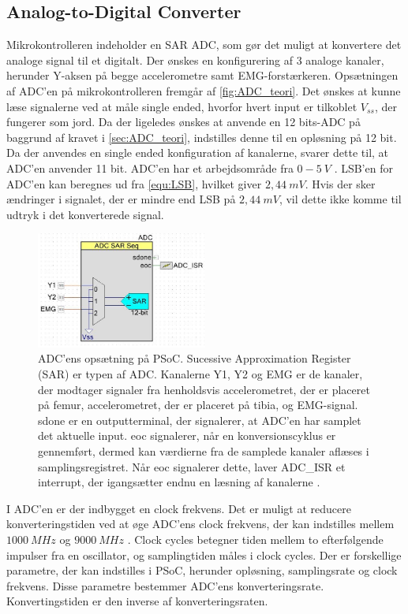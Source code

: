 \subsection{Analog-to-Digital Converter}
Mikrokontrolleren indeholder en SAR ADC, som gør det muligt at konvertere det analoge signal til et digitalt. Der ønskes en konfigurering af 3 analoge kanaler, herunder Y-aksen på begge accelerometre samt EMG-forstærkeren. Opsætningen af ADC'en på mikrokontrolleren fremgår af \autoref{fig:ADC_teori}. Det ønskes at kunne læse signalerne ved at måle single ended, hvorfor hvert input er tilkoblet $V_{ss}$, der fungerer som jord. Da der ligeledes ønskes at anvende en 12 bits-ADC på baggrund af kravet i \autoref{sec:ADC_teori}, indstilles denne til en opløsning på 12 bit. Da der anvendes en single ended konfiguration af kanalerne, svarer dette til, at ADC'en anvender 11 bit. ADC'en har et arbejdsområde fra $0-5~V$ \citep{ADC2014}. LSB'en for ADC'en kan beregnes ud fra \autoref{equ:LSB}, hvilket giver $2,44~mV$. Hvis der sker ændringer i signalet, der er mindre end LSB på $2,44~mV$, vil dette ikke komme til udtryk i det konverterede signal. 


\begin{figure}[H]
\centering
\includegraphics[width=0.5\textwidth]{figures/implementering/ADC_imp.jpg}
\caption{ADC'ens opsætning på PSoC. Sucessive Approximation Register (SAR) er typen af ADC. Kanalerne Y1, Y2 og EMG er de kanaler, der modtager signaler fra henholdsvis accelerometret, der er placeret på femur, accelerometret, der er placeret på tibia, og EMG-signal. sdone er en outputterminal, der signalerer, at ADC'en har samplet det aktuelle input. eoc signalerer, når en konversionscyklus er gennemført, dermed kan værdierne fra de samplede kanaler aflæses i samplingsregistret. Når eoc signalerer dette, laver ADC\_ISR et interrupt, der igangsætter endnu en læsning af kanalerne \citep{ADC2014}.}
\label{fig:ADC_teori}
\end{figure}

\noindent
I ADC'en er der indbygget en clock frekvens. Det er muligt at reducere konverteringstiden ved at øge ADC'ens clock frekvens, der kan indstilles mellem $1000~MHz$ og $9000~MHz$ \citep{ADC2014}. Clock cycles betegner tiden mellem to efterfølgende impulser fra en oscillator, og samplingtiden måles i clock cycles. Der er forskellige parametre, der kan indstilles i PSoC, herunder opløsning, samplingsrate og clock frekvens. Disse parametre bestemmer ADC'ens konverteringsrate. Konvertingstiden er den inverse af konverteringsraten. 

